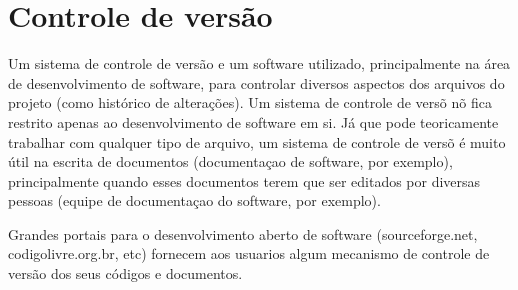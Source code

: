 \section{Controle de vers\~ao}

Um sistema de controle de vers\~ao e um software utilizado, principalmente na \'area de
desenvolvimento de software, para controlar diversos aspectos dos arquivos do projeto (como
hist\'orico de altera\c{c}\~oes). Um sistema de controle de vers\~o n\~o fica restrito apenas ao desenvolvimento de software em si. J\'a que pode teoricamente trabalhar com qualquer tipo de arquivo, um sistema de controle de vers\~o \'e muito \'util na escrita de documentos (documenta\c{c}ao de software, por exemplo), principalmente quando esses documentos terem que ser editados por diversas pessoas (equipe de documenta\c{c}ao do software, por exemplo).

Grandes portais para o desenvolvimento aberto de software (sourceforge.net, codigolivre.org.br, etc) fornecem aos usuarios algum mecanismo de controle de vers\~ao dos seus c\'odigos e documentos.